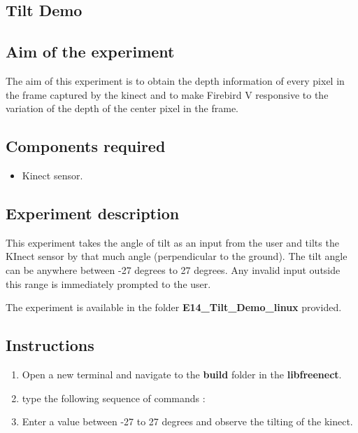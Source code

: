 \begin{flushleft}
\section{\textbf{ Tilt Demo}}
\label{4.14}

\medskip
\subsection{\textbf{ Aim of the experiment}}
The aim of this experiment is to obtain the depth information of every pixel in the frame captured by the kinect and to make Firebird V responsive to the variation of the depth of the center pixel in the frame.
\medskip

\subsection{\textbf{ Components required}}
\begin{itemize}
 \item Kinect sensor.
 \end{itemize}
\medskip

\subsection{\textbf{ Experiment description}}
This experiment takes the angle of tilt as an input from the user and tilts the KInect sensor by that much angle (perpendicular to the ground). The tilt angle can be anywhere between -27 degrees to 27 degrees. Any invalid input outside this range is immediately prompted to the user. 


\medskip
The experiment is available in the folder \textbf{E14\_Tilt\_Demo\_linux} provided.
\medskip

\subsection{\textbf{ Instructions}}
\begin{enumerate} 
\item Open a new terminal and navigate to the \textbf{build} folder in the \textbf{libfreenect}.
\item type the following sequence of commands :
\item Enter a value between -27 to 27 degrees and observe the tilting of the kinect.


\end{enumerate}
\end{flushleft}

